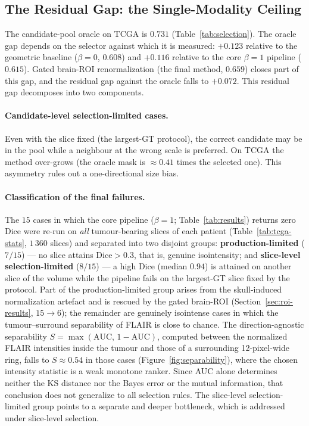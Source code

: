 \documentclass[11pt,a4paper]{article}
\begin{document}
\iffalse %
\subsection{The Residual Gap: the Single-Modality Ceiling}\label{sec:ceiling}

The candidate-pool oracle on TCGA is $0.731$ (Table~\ref{tab:selection}). The
oracle gap depends on the selector against which it is measured: $+0.123$ relative
to the geometric baseline ($\beta{=}0$, $0.608$) and $+0.116$ relative to the core
$\beta{=}1$ pipeline ($0.615$). Gated brain-ROI renormalization (the final method,
$0.659$) closes part of this gap, and the residual gap against the oracle falls to
$+0.072$. This residual gap decomposes into two components.

\paragraph{Candidate-level selection-limited cases.} Even with the slice fixed
(the largest-GT protocol), the correct candidate may be in the pool while a
neighbour at the wrong scale is preferred. On TCGA the method over-grows (the
oracle mask is $\approx 0.41$ times the selected one). This asymmetry rules out a
one-directional size bias.

\paragraph{Classification of the final failures.} The $15$ cases in which the core
pipeline ($\beta{=}1$; Table~\ref{tab:results}) returns zero Dice were re-run on
\emph{all} tumour-bearing slices of each patient (Table~\ref{tab:tcga-stats},
$1\,360$ slices) and separated into two disjoint groups:
\textbf{production-limited} ($7/15$) --- no slice attains Dice$>0.3$, that is,
genuine isointensity; and \textbf{slice-level selection-limited} ($8/15$) --- a
high Dice (median $0.94$) is attained on another slice of the volume while the
pipeline fails on the largest-GT slice fixed by the protocol. Part of the
production-limited group arises from the skull-induced normalization artefact and
is rescued by the gated brain-ROI (Section~\ref{sec:roi-results}, $15\to 6$); the
remainder are genuinely isointense cases in which the tumour--surround
separability of FLAIR is close to chance. The direction-agnostic separability
$S=\max(\mathrm{AUC},\,1{-}\mathrm{AUC})$, computed between the normalized FLAIR
intensities inside the tumour and those of a surrounding 12-pixel-wide ring, falls
to $S\approx0.54$ in those cases (Figure~\ref{fig:separability}), where the chosen
intensity statistic is a weak monotone ranker. Since AUC alone determines neither
the KS distance nor the Bayes error or the mutual information, that conclusion does
not generalize to all selection rules. The slice-level selection-limited group points to a
separate and deeper bottleneck, which is addressed under slice-level selection.
\end{document}
